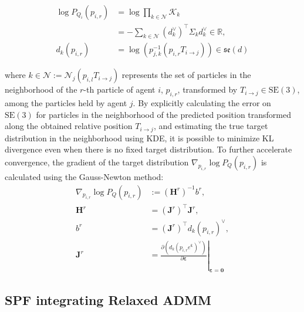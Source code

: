 \documentclass[a4paper,fleqn,10pt,twocolumn]{SICE_ISCS}
\begin{document}
\begin{equation}
\begin{aligned}\label{eq:log_target_dist}
    \log P_{Q_i}(p_{i,r}) &= \log \prod_{k\in {\mathcal{N}}} {\mathcal{K}}_k\\
    &= -\sum_{k\in {\mathcal{N}}} (d_k^\vee)^{\top} \Sigma_k d_k^\vee \in \mathbb{R},\\
d_k(p_{i,r})&=\log \left(p_{j,k}^{-1} (p_{i,r}T_{i\rightarrow j}) \right)\in {\mathfrak{se}}(d)
\end{aligned}
\end{equation}

where $k\in{\mathcal{N}} := {\mathcal{N}}_{j}(p_{i,l}T_{i\rightarrow j})$ represents the set of particles in the neighborhood of the $r$-th particle of agent $i$, $p_{i,r}$, transformed by $T_{i\rightarrow j}\in \mathrm{SE(3)}$, among the particles held by agent $j$. By explicitly calculating the error on $\mathrm{SE(3)}$ for particles in the neighborhood of the predicted position transformed along the obtained relative position $T_{i\rightarrow j}$, and estimating the true target distribution in the neighborhood using KDE, it is possible to minimize KL divergence even when there is no fixed target distribution.
To further accelerate convergence, the gradient of the target distribution $\nabla_{p_{i,r}}\log P_Q(p_{i,r})$ is calculated using the Gauss-Newton method:
\begin{equation}
\begin{aligned}\label{eq:gauss_newton}
\nabla_{p_{i,r}}\log P_Q(p_{i,r})&:=
({\mathbf{H}}^r)^{-1}b^r,\\
{\mathbf{H}}^r &= ({\mathbf{J}}^r)^\top {\mathbf{J}}^r, \\
b^r&=({\mathbf{J}}^r)^\top d_k(p_{i,r})^\vee,\\
{\mathbf{J}}^r&=\left. \frac{\partial(d_k(p_{i,r}e^{{{\boldsymbol{\varepsilon}}}})^\vee
)}{\partial {{\boldsymbol{\varepsilon}}}}\right|_{{{\boldsymbol{\varepsilon}}}={\mathbf{0}}}
\end{aligned}
\end{equation}

\subsection{SPF integrating Relaxed ADMM}
\end{document}
